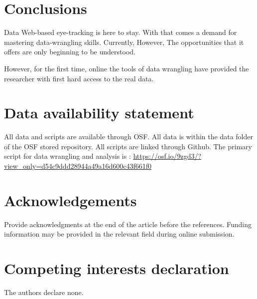 \section{Conclusions}
Data 
Web-based eye-tracking is here to stay. With that comes a demand for mastering data-wrangling skills. Currently, However, The opportunities that it offers are only beginning to be understood. 


However, for the first time, online the tools of data wrangling  have provided the researcher with first hard access to the real data.  


 
\section{Data availability statement}
All data and scripts are available through OSF. All data is within the data folder of the OSF stored repository. All scripts are linked through Github. The primary script for data wrangling and analysis is : \url{https://osf.io/9zgd3/?view_only=d54c9ddd28944a49a16d600c43f661f0}

\section{Acknowledgements}
Provide acknowledgments at the end of the article before the references. Funding information may be provided in the relevant field during online submission. 

\section{Competing interests declaration}
The authors declare none.
